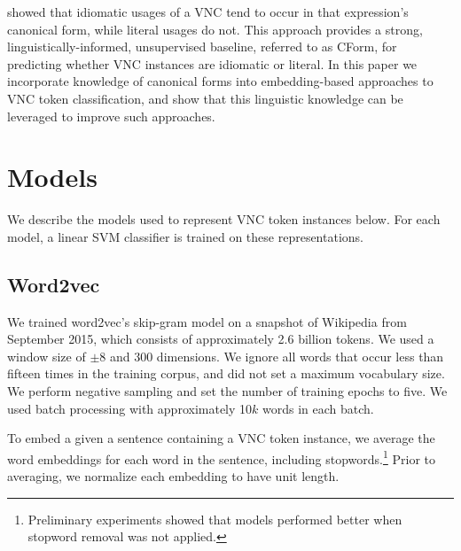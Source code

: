 \documentclass[11pt,a4paper]{article}
\begin{document}
 showed that idiomatic usages of a VNC tend to
occur in that expression's canonical form, while literal usages do
not. This approach provides a strong, linguistically-informed,
unsupervised baseline, referred to as CForm, for predicting whether
VNC instances are idiomatic or literal. In this paper we incorporate
knowledge of canonical forms into embedding-based approaches to VNC
token classification, and show that this linguistic knowledge can be
leveraged to improve such approaches.




















 

















\section{Models}\label{models}


We describe the models used to represent VNC token instances
below. For each model, a linear SVM classifier is trained on these
representations.


\subsection{Word2vec}\label{word2vec}

We trained word2vec's skip-gram model \citep{mikolov+:2013b} on a
snapshot of Wikipedia from September 2015, which consists of
approximately 2.6 billion tokens. We used a window size of $\pm$8 and
300 dimensions. We ignore all words that occur less than fifteen times
in the training corpus, and did not set a maximum vocabulary size. We
perform negative sampling and set the number of training epochs to
five. We used batch processing with approximately 10$k$ words in each
batch.
	

To embed a given a sentence containing a VNC token instance, we
average the word embeddings for each word in the sentence, including
stopwords.\footnote{Preliminary experiments showed that models
  performed better when stopword removal was not applied.} Prior to
averaging, we normalize each embedding to have unit length.
\end{document}
